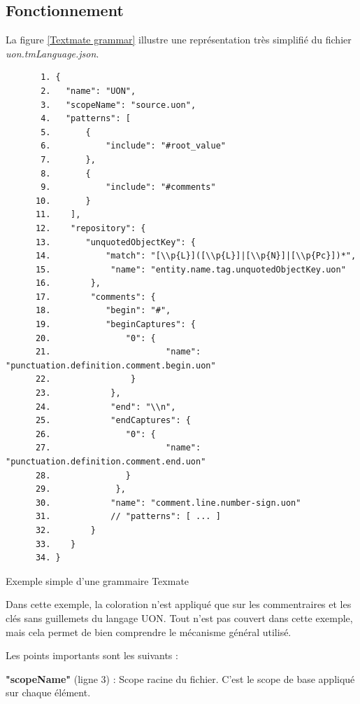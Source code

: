 \documentclass[
    iict, %
    il, %
]{heig-tb}
\begin{document}
\subsection{Fonctionnement}

La figure \ref{Textmate grammar} illustre une représentation très simplifié du fichier \emph{uon.tmLanguage.json}.

\begin{listing}[!ht]
    \begin{verbatim}
       1. {
       2.   "name": "UON",
       3.   "scopeName": "source.uon",
       4.   "patterns": [
       5.       {
       6.           "include": "#root_value"
       7.       },
       8.       {
       9.           "include": "#comments"
      10.       }
      11.    ],
      12.    "repository": {
      13.       "unquotedObjectKey": {
      14.           "match": "[\\p{L}]([\\p{L}]|[\\p{N}]|[\\p{Pc}])*",
      15.            "name": "entity.name.tag.unquotedObjectKey.uon"
      16.        },
      17.        "comments": {
      18.           "begin": "#",
      19.           "beginCaptures": {
      20.               "0": {
      21.                       "name": "punctuation.definition.comment.begin.uon"
      22.                }
      23.            },
      24.            "end": "\\n",
      25.            "endCaptures": {
      26.               "0": {
      27.                       "name": "punctuation.definition.comment.end.uon"
      28.               }
      29.             },
      30.            "name": "comment.line.number-sign.uon"
      31.            // "patterns": [ ... ]
      32.        }
      33.    }
      34. }
    \end{verbatim}
    \caption{Exemple simple d'une grammaire Texmate}
    \label{Textmate grammar}
\end{listing}

Dans cette exemple, la coloration n'est appliqué que sur les commentraires et les clés sans guillemets du langage UON.
Tout n'est pas couvert dans cette exemple, mais cela permet de bien comprendre le mécanisme général utilisé.

Les points importants sont les suivants :

\textbf{"scopeName"} (ligne 3) : Scope racine du fichier. C'est le scope de base appliqué sur chaque élément.
\end{document}
